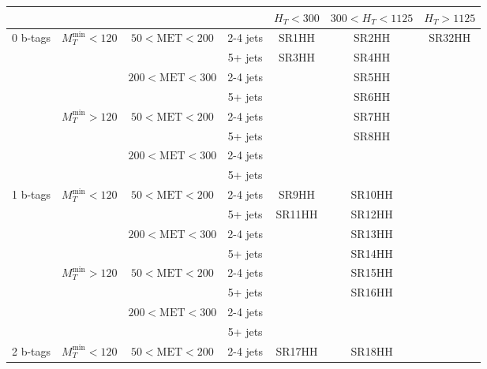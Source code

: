 \documentclass[plain,landscape]{article}
\begin{document}
\begin{table}
\renewcommand{\arraystretch}{1.3}
\centering
\begin{tabular}{|c|c|c|c|c|c|c|}
\hline
& & \multicolumn{2}{|c|}{ } & $H_T < 300$ & $300 < H_T < 1125$ & $H_T > 1125$  \\
\hline
\multirow{8}{*}{0 b-tags} &  \multirow{4}{*}{$M_T^{\textrm{min}} < 120$} & \multirow{2}{*}{ $50 < \textrm{MET} < 200$} & 2-4 jets & SR1HH & SR2HH & \multirow{30}{*}{SR32HH}\\
\cline{4-6}
& & & 5+ jets & \multirow{7}{*}{SR3HH} & SR4HH & \\
\cline{3-4} \cline{6-6}
& &  \multirow{2}{*}{$200 < \textrm{MET} < 300$} &  2-4 jets & &  SR5HH & \\
\cline{4-4} \cline{6-6}
& & & 5+ jets & & SR6HH &  \\
\cline{2-4} \cline{6-6}
& \multirow{4}{*}{$M_T^{\textrm{min}} > 120$} & \multirow{2}{*}{ $50 < \textrm{MET} < 200$} & 2-4 jets & & SR7HH & \\
\cline{4-4} \cline{6-6}
& & & 5+ jets & & \multirow{3}{*}{SR8HH} & \\
\cline{3-4}
& &  \multirow{2}{*}{$200 < \textrm{MET} < 300$} &  2-4 jets & & &  \\
\cline{4-4} 
& & & 5+ jets & & &  \\
\cline{1-6}
\multirow{8}{*}{1 b-tags} & \multirow{4}{*}{$M_T^{\textrm{min}} < 120$} & \multirow{2}{*}{ $50 < \textrm{MET} < 200$} & 2-4 jets & SR9HH & SR10HH & \\
\cline{4-6}
& & & 5+ jets & \multirow{7}{*}{SR11HH} & SR12HH & \\
\cline{3-4} \cline{6-6}
& & \multirow{2}{*}{ $200 < \textrm{MET} < 300$} &  2-4 jets & &  SR13HH & \\
\cline{4-4} \cline{6-6}
& & & 5+ jets & & SR14HH & \\
\cline{2-4} \cline{6-6}
 & \multirow{4}{*}{$M_T^{\textrm{min}} > 120$} & \multirow{2}{*}{ $50 < \textrm{MET} < 200$} & 2-4 jets & & SR15HH & \\
\cline{4-4} \cline{6-6}
& & & 5+ jets &  & \multirow{3}{*}{SR16HH} & \\
\cline{3-4}
& & \multirow{2}{*}{ $200 < \textrm{MET} < 300$} &  2-4 jets & & & \\
\cline{4-4}
& & & 5+ jets & & & \\
\cline{1-6}
\multirow{8}{*}{2 b-tags} & \multirow{4}{*}{$M_T^{\textrm{min}} < 120$} & \multirow{2}{*}{ $50 < \textrm{MET} < 200$} & 2-4 jets & SR17HH & SR18HH & \\

\end{tabular}
\end{table}
\end{document}
